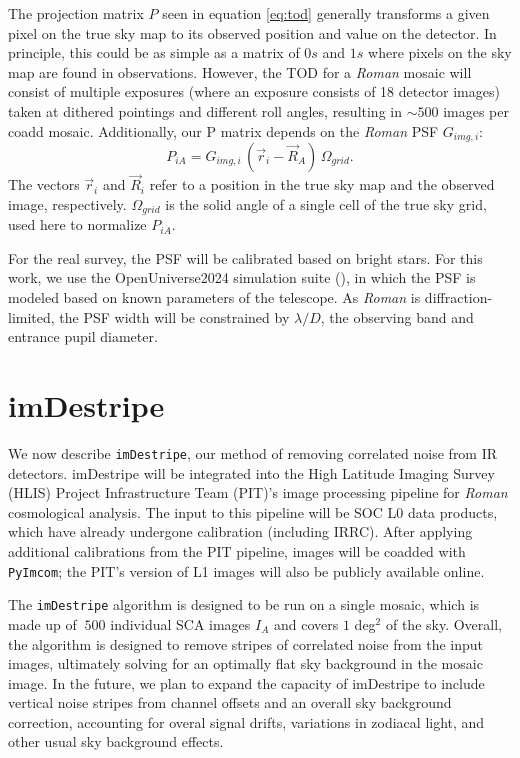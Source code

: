 \documentclass[12pt]{pasj01}
\begin{document}
The projection matrix $P$ seen in equation \ref{eq:tod} generally transforms a given pixel on the true sky map to its observed position and value on the detector. In principle, this could be as simple as a matrix of $0s$ and $1s$ where pixels on the sky map are found in observations. However, the TOD for a \textit{Roman} mosaic will consist of multiple exposures (where an exposure consists of 18 detector images) taken at dithered pointings and different roll angles, resulting in $\sim500$ images per coadd mosaic. Additionally, our P matrix depends on the \textit{Roman} PSF $G_{img, i}$: \begin{equation}P_{iA} = G_{img, i}\,(\Vec{r}_i - \Vec{R}_A)\,\Omega_{grid}  .\end{equation} 
The vectors $\Vec{r}_{i}$ and $\Vec{R}_{i}$ refer to a position in the true sky map and the observed image, respectively. $\Omega_{grid}$ is the solid angle of a single cell of the true sky grid, used here to normalize $P_{iA}$. 

For the real survey, the PSF will be calibrated based on bright stars. For this work, we use the OpenUniverse2024 simulation suite (\cite{OpenUniverse2025}), in which the PSF is modeled based on known parameters of the telescope. As \textit{Roman} is diffraction-limited, the PSF width will be constrained by $\lambda/D$, the observing band and entrance pupil diameter. 

\section{imDestripe}

We now describe \texttt{imDestripe}, our method of removing correlated noise from IR detectors. imDestripe will be integrated into the High Latitude Imaging Survey (HLIS) Project Infrastructure Team (PIT)'s image processing pipeline for \textit{Roman} cosmological analysis. The input to this pipeline will be SOC L0 data products, which have already undergone calibration (including IRRC). After applying additional calibrations from the PIT pipeline, images will be coadded with \texttt{PyImcom}; the PIT's version of L1 images will also be publicly available online.

The \texttt{imDestripe} algorithm is designed to be run on a single mosaic, which is made up of $~500$ individual SCA images $I_A$ and covers $1$ deg$^2$ of the sky. Overall, the algorithm is designed to remove stripes of correlated noise from the input images, ultimately solving for an optimally flat sky background in the mosaic image. In the future, we plan to expand the capacity of imDestripe to include vertical noise stripes from channel offsets and an overall sky background correction, accounting for overal signal drifts, variations in zodiacal light, and other usual sky background effects.
\end{document}
